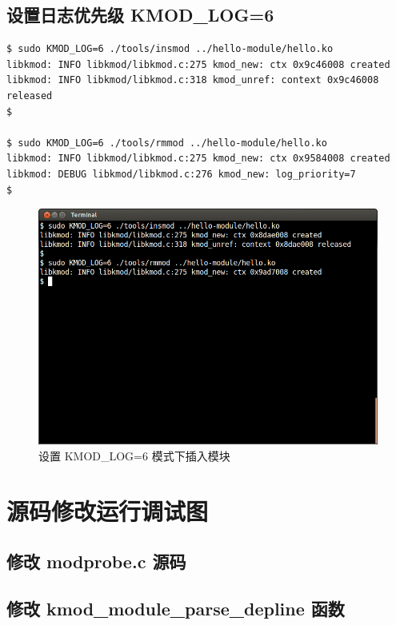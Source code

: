 \subsection{设置日志优先级 KMOD\_LOG=6}

{\begin{shaded}\begin{verbatim}
$ sudo KMOD_LOG=6 ./tools/insmod ../hello-module/hello.ko
libkmod: INFO libkmod/libkmod.c:275 kmod_new: ctx 0x9c46008 created
libkmod: INFO libkmod/libkmod.c:318 kmod_unref: context 0x9c46008 released
$ 

$ sudo KMOD_LOG=6 ./tools/rmmod ../hello-module/hello.ko
libkmod: INFO libkmod/libkmod.c:275 kmod_new: ctx 0x9584008 created
libkmod: DEBUG libkmod/libkmod.c:276 kmod_new: log_priority=7
$ 
\end{verbatim}\end{shaded}}
\begin{figure}[htbp]
\centering
\includegraphics{./pictures/2-4-insmod2.png}
\caption{设置 KMOD\_LOG=6 模式下插入模块}
\end{figure}

\section{源码修改运行调试图}

\subsection{修改 modprobe.c 源码}

\subsection{修改 kmod\_module\_parse\_depline 函数}

